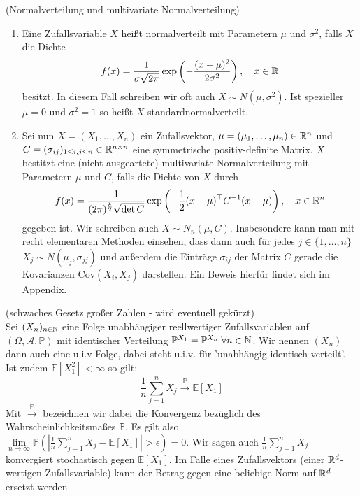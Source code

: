 \begin{Definition}(Normalverteilung und multivariate Normalverteilung)
	\label{normalvert}
	\begin{enumerate}[label=(\alph*)]
		\item Eine Zufallsvariable $ X $ heißt normalverteilt mit Parametern $ \mu $ und $ \sigma^2 $, falls $ X $ die Dichte 
		\[
			f(x) = \frac{1}{\sigma \sqrt{2 \pi}} \exp\left(-\frac{(x-\mu)^2}{2\sigma^2}\right), \quad x \in \mathbb{R} 
		\]
		besitzt. In diesem Fall schreiben wir oft auch $ X \sim N(\mu,\sigma^2) $. Ist spezieller $ \mu = 0 $ und $ \sigma^2 =1$ so heißt $ X $ standardnormalverteilt.
		\item Sei nun $ X = (X_1,\dots,X_n) $ ein Zufallsvektor, $ \mu =(\mu_1,\dots,\mu_n) \in \mathbb{R}^n $ und $ C = (\sigma_{ij})_{1 \leq i,j \leq n} \in \mathbb{R}^{n \times n} $ eine symmetrische positiv-definite Matrix.
		$ X $ bestitzt eine (nicht ausgeartete) multivariate Normalverteilung mit Parametern $ \mu $ und $ C $, falls die Dichte von $ X $ durch 
		\[
			f(x) = \frac{1}{(2\pi)^{\frac{k}{2}}\sqrt{\det C}}\exp\left(-\frac{1}{2}(x-\mu)^{\top}C^{-1}(x-\mu)  \right), \quad x\in \mathbb{R}^n
		\]
		gegeben ist. Wir schreiben auch $ X \sim N_n(\mu,C)  $.
		Insbesondere kann man mit recht elementaren Methoden einsehen, dass dann auch für jedes $ j \in \{ 1,\dots,n\} $ $ X_j \sim N(\mu_j,\sigma_{jj}) $ und außerdem die Einträge $ \sigma_{ij} $ der Matrix $ C $ gerade die Kovarianzen $ \text{Cov}(X_i,X_j) $ darstellen. Ein Beweis hierfür findet sich im Appendix.
		
	\end{enumerate}
\end{Definition}
\begin{Satz}(schwaches Gesetz großer Zahlen - wird eventuell gekürzt) \\
	\label{schwacheGgZ}
	Sei $ (X_n)_{n \in \mathbb{N} } $ eine Folge unabhängiger reellwertiger Zufallsvariablen auf $ (\Omega,\mathcal{A},\mathbb{P}) $ mit identischer Verteilung $ \mathbb{P}^{X_1} = \mathbb{P}^{X_n} \; \forall n \in \mathbb{N}$. Wir nennen $ (X_n) $ dann auch eine u.i.v-Folge, dabei steht u.i.v. für 'unabhängig identisch verteilt'.
	Ist zudem $ \mathbb{E}[X_1^2] < \infty $ so gilt:
	\[
		\frac{1}{n} \sum_{j=1}^n X_j \stackrel{\mathbb{P}}{\to} \mathbb{E}[X_1]
	\]
	Mit $ \stackrel{\mathbb{P}}{\to} $ bezeichnen wir dabei die Konvergenz bezüglich des Wahrscheinlichkeitsmaßes $ \mathbb{P} $. Es gilt also 
	$ \lim\limits_{n \to \infty} \mathbb{P}(|\frac{1}{n} \sum\limits_{j=1}^n X_j - \mathbb{E}[X_1]|>\epsilon) = 0 $. Wir sagen auch $ \frac{1}{n} \sum\limits_{j=1}^n X_j $ konvergiert stochastisch gegen $ \mathbb{E}[X_1] $. Im Falle eines Zufallsvektors (einer $ \mathbb{R}^d $-wertigen Zufallsvariable) kann der Betrag gegen eine beliebige Norm auf $ \mathbb{R}^d $ ersetzt werden.
\end{Satz}

